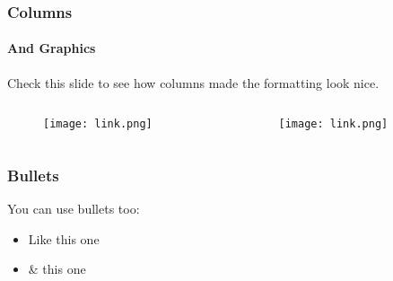 \begin{frame}
    \frametitle{Columns}
    \framesubtitle{And Graphics}

    Check this slide to see how columns made the formatting look nice.

    \begin{columns}[t] %
        \begin{column}{0.5\textwidth} %
            \begin{figure}[h!]
                \centering
                \texttt{[image: link.png]}
                \label{Figure 1}
            \end{figure}
        \end{column}
        \begin{column}{0.5\textwidth} %
            \begin{figure}[h!]
                \centering
                \texttt{[image: link.png]}
                \label{Figure 2}
            \end{figure}
        \end{column}
    \end{columns}
\end{frame}

\begin{frame}
    \frametitle{Bullets}
    You can use bullets too: \newline
    \begin{itemize}
        \item Like this one \newline
        \item \& this one
    \end{itemize}
\end{frame}

